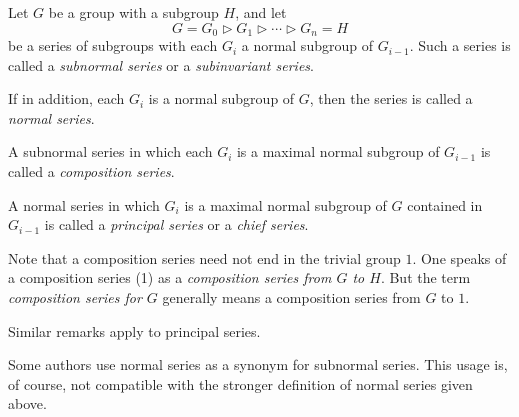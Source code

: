 \documentclass[12pt]{article}
\begin{document}

Let $G$ be a group with a subgroup $H$, and let
\begin{equation}
G = G_0 \rhd G_1 \rhd \cdots \rhd G_n = H
\end{equation}
be a series of subgroups with each $G_i$ a normal subgroup of $G_{i-1}$.
Such a series is called a \emph{subnormal series} or a \emph{subinvariant series}.

If in addition, each $G_i$ is a normal subgroup of $G$,
then the series is called a \emph{normal series}.

A subnormal series in which each $G_i$ is a maximal normal subgroup
of $G_{i-1}$ is called a \emph{composition series}.

A normal series in which $G_i$ is a maximal normal subgroup of $G$ contained in $G_{i-1}$
is called a \emph{principal series} or a \emph{chief series}.

Note that a composition series need not end in the trivial group $1$.
One speaks of a composition series (1) as a \emph{composition series from $G$ to $H$}.
But the term \emph{composition series for $G$}
generally means a composition series from $G$ to $1$.

Similar remarks apply to principal series.

Some authors use normal series as a synonym for subnormal series.  This usage is, of course, not compatible with the stronger definition of normal series given above.
\end{document}
